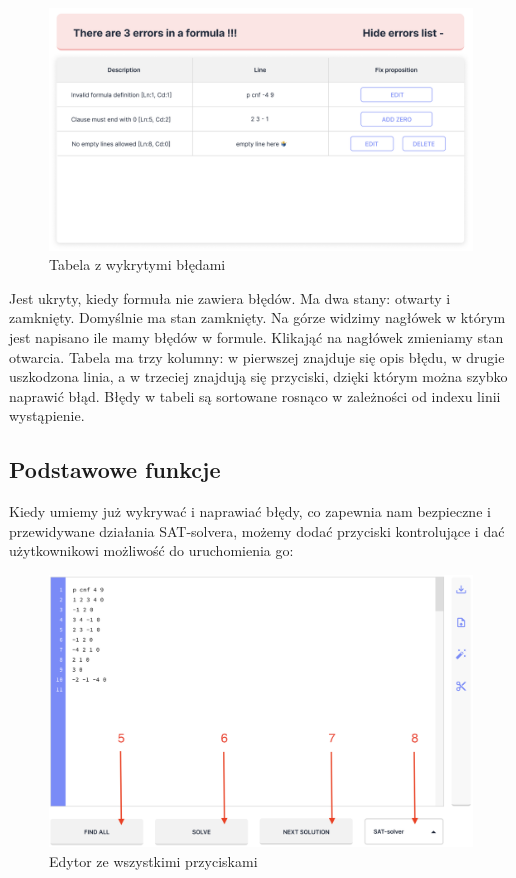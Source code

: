 \documentclass[a4paper,12pt,oneside]{book}
\theoremstyle{definition}
\begin{document}
\begin{figure}[ht]
    \centering
    \includegraphics[width=14.30cm]{6}
    \caption{Tabela z wykrytymi błędami}
    \label{fig:6}
\end{figure}

\noindent Jest ukryty, kiedy formuła nie zawiera błędów. Ma dwa stany: otwarty i zamknięty. Domyślnie ma stan zamknięty. Na górze widzimy nagłówek w którym jest napisano ile mamy błędów w formule. Klikająć na nagłówek zmieniamy stan otwarcia. Tabela ma trzy kolumny: w pierwszej znajduje się opis błędu, w drugie uszkodzona linia, a w trzeciej znajdują się przyciski, dzięki którym można szybko naprawić błąd. Błędy w tabeli są sortowane rosnąco w zależności od indexu linii wystąpienie.

\subsection{Podstawowe funkcje}

Kiedy umiemy już wykrywać i naprawiać błędy, co zapewnia nam bezpieczne i przewidywane działania SAT-solvera, możemy dodać przyciski kontrolujące i dać użytkownikowi możliwość do uruchomienia go:

\begin{figure}[ht]
    \centering
    \includegraphics[width=14.30cm]{7}
    \caption{Edytor ze wszystkimi przyciskami}
    \label{fig:7}
\end{figure}
\end{document}
